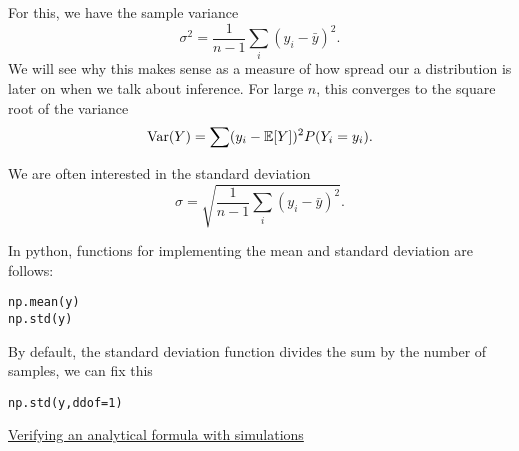  For this, we have the {\dfn sample variance}
\begin{equation}
\sigma^2 = \frac{1}{n-1}\sum_{i}(y_i-\bar{y})^2.
\end{equation}
We will see why this makes sense as a measure of how spread our a distribution is later on when we talk about inference. For large $n$, this converges to the square root of the variance
\begin{equation}
{\rm Var}(Y) = \sum (y_i - \mathbb E[Y])^2 P(Y_i=y_i).
\end{equation}

We are often interested in the standard deviation 
\begin{equation}
\sigma = \sqrt{\frac{1}{n-1}\sum_{i}(y_i-\bar{y})^2}.
\end{equation}







In python, functions for implementing the mean and standard deviation are follows:
\begin{Verbatim}
np.mean(y)
np.std(y)
\end{Verbatim}
By default, the standard deviation function divides the sum by the number of samples, we can fix this 
\begin{Verbatim}
np.std(y,ddof=1)
\end{Verbatim}

%


\begin{example}
\href{https://colab.research.google.com/drive/1Gs-gSsUP1hHVwhrbwvWzLVm1ulcLJKRI#scrollTo=36vlB9r1Wts5}{Verifying an analytical formula with simulations}
\end{example}

%
%


